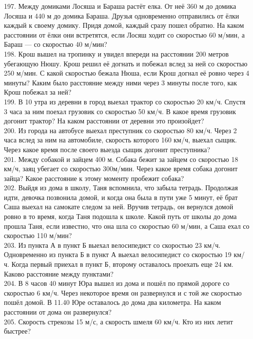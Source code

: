 197. Между домиками Лосяша и Бараша растёт елка. От неё 360 м до домика Лосяша и 440 м до домика Бараша. Друзья одновременно отправились от ёлки каждый к своему домику. Придя домой, каждый сразу пошел обратно. На каком расстоянии от ёлки они встретятся, если Лосяш ходит со скоростью 60 м/мин, а Бараш --- со скоростью 40 м/мин?\\
198. Крош вышел на тропинку и увидел впереди на расстоянии 200 метров убегающую Нюшу. Крош решил её догнать и побежал вслед за ней со скоростью 250 м/мин. С какой скоростью бежала Нюша, если Крош догнал её ровно через 4 минуты? Каким было расстояние между ними через 3 минуты после того, как Крош побежал за ней?\\
199.  В 10 утра из деревни в город выехал трактор со скоростью 20 км/ч. Спустя 3 часа за ним поехал грузовик со скоростью 50 км/ч. В какое время грузовик догонит трактор? На каком расстоянии от деревни это произойдет?\\
200. Из города на автобусе выехал преступник со скоростью 80 км/ч. Через 2 часа вслед за ним на автомобиле, скорость которого 160 км/ч, выехал сыщик. Через какое время после своего выезда сыщик догонит преступника?\\
201.  Между собакой и зайцем 400 м. Собака бежит за зайцем со скоростью 18 км/ч, заяц убегает со скоростью 300м/мин. Через какое время собака догонит зайца? Какое расстояние к этому моменту пробежит собака?\\
202. Выйдя из дома в школу, Таня вспомнила, что забыла тетрадь. Продолжая идти, девочка позвонила домой, и когда она была в пути уже 5 минут, её брат Саша выехал на самокате следом за ней. Вручив тетрадь, он вернулся домой ровно в то время, когда Таня подошла к школе. Какой путь от школы до дома прошла Таня, если известно, что она шла со скоростью 60 м/мин, а Саша ехал со скоростью 110 м/мин?\\
203. Из пункта А в пункт Б выехал велосипедист со скоростью 23 км/ч. Одновременно из пункта Б в пункт А выехал велосипедист со скоростью 19 км/ч. Когда первый приехал в пункт Б, второму оставалось проехать еще 24 км. Каково расстояние между пунктами?\\
204. В 8 часов 40 минут Юра вышел из дома и пошёл по прямой дороге со скоростью 6 км/ч. Через некоторое время он развернулся и с той же скоростью пошёл домой. В 11.40 Юре оставалось до дома два километра. На каком расстоянии от дома он развернулся?\\
205. Скорость стрекозы 15 м/с, а скорость шмеля 60 км/ч. Кто из них летит быстрее?\\
